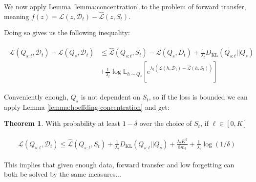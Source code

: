 \documentclass[letterpaper]{article}
\theoremstyle{definition}
\newtheorem{theorem}{Theorem}
\begin{document}
We now apply Lemma \ref{lemma:concentration} to the problem of forward transfer, meaning $f(z)=\mathcal{L}(z,\mathcal{D}_t)-\hat{\mathcal{L}}(z,S_t)$.

Doing so gives us the following inequality:

\begin{align}
\begin{split}
\mathcal{L}(Q_{s:t},\mathcal{D}_t) - \mathcal{L}(Q_{s},\mathcal{D}_t) &\leq \hat{\mathcal{L}}(Q_{s:t}, S_t) - \mathcal{L}(Q_{s}, D_t) + \frac{1}{\lambda_t} D_{\mathrm{KL}}(Q_{s:t}||Q_{s})\\
&+\frac{1}{\lambda_t}\log\mathbb{E}_{h\sim Q_{s}}\left [e^{\lambda_t(\mathcal{L}(h,\mathcal{D}_t)-\hat{\mathcal{L}}(h,S_t))} \right ]
\end{split}
\end{align}

Conveniently enough, $Q_s$ is not dependent on $S_t$, so if the loss is bounded we can apply Lemma \ref{lemma:hoeffding-concentration} and get:
\begin{theorem}
With probability at least $1-\delta$ over the choice of $S_t$, if $\ell\in[0,K]$

\begin{align}
\begin{split}
\mathcal{L}(Q_{s:t},\mathcal{D}_t) \leq \hat{\mathcal{L}}(Q_{s:t}, S_t) + \frac{1}{\lambda_t} D_{\mathrm{KL}}(Q_{s:t}||Q_{s})+\frac{\lambda_t K^2}{8m_t}+\frac{1}{\lambda_t}\log(1/\delta)
\end{split}
\end{align}
\end{theorem}

This implies that given enough data, forward transfer and low forgetting can both be solved by the same measures...


\end{document}
